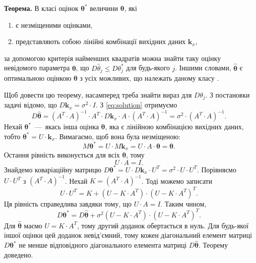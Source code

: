 \textbf{Теорема.}
В класі оцінок $\boldsymbol{\theta}^*$ величини $\boldsymbol{\theta}$, які
\begin{enumerate}
  \item є незміщеними оцінками,
  \item представляють собою лінійні комбінації вихідних даних $\boldsymbol{k}_x$,
\end{enumerate}
за допомогою критерія найменших
квадратів можна знайти таку оцінку невідомого параметра $\boldsymbol{\theta}$,
що $D\hat{\theta}_j \leq D \theta_j^*$ для будь-якого $j$.
Іншими словами,
$\hat{\boldsymbol{\theta}}$ є оптимальною оцінкою $\boldsymbol{\theta}$ з усіх можливих,
що належать даному класу \cite{hudson:least-squares}.

Щоб довести цю теорему, насамперед треба знайти вираз для $D \theta_j$.
З постановки задачі відомо, що $D\boldsymbol{k}_x = \sigma^2 \cdot I$.
З \eqref{eq:solution} отримуємо
\begin{equation*}
  D\hat{\boldsymbol{\theta}} =
  \left( A^T \cdot A \right)^{-1} \cdot A^T \cdot D\boldsymbol{k}_x \cdot A \cdot
  \left( A^T \cdot A \right)^{-1} =
  \sigma^2 \cdot \left( A^T \cdot A \right)^{-1}.
\end{equation*}
Нехай $\boldsymbol{\theta}^*$~---~якась інша оцінка $\boldsymbol{\theta}$,
яка є лінійною комбінацією вихідних даних,
тобто $\boldsymbol{\theta}^* = U \cdot \boldsymbol{k}_x$.
Вимагаємо, щоб вона була незміщеною:
\begin{equation*}
  M\boldsymbol{\theta}^* =
  U \cdot M\boldsymbol{k}_x =
  U \cdot A \cdot \boldsymbol{\theta} =
  \boldsymbol{\theta}.
\end{equation*}
Остання рівність виконується для всіх $\boldsymbol{\theta}$, тому
\begin{equation*}
  U \cdot A = I.
\end{equation*}
Знайдемо коваріаційну матрицю
$D\boldsymbol{\theta}^* =
  U \cdot D\boldsymbol{k}_x \cdot U^T =
  \sigma^2 \cdot U \cdot U^T$.
Порівняємо $U \cdot U^T$ з $ \left( A^T \cdot A \right)^{-1}$.
Нехай $K = \left( A^T \cdot A \right)^{-1}$.
Тоді можемо записати
\begin{equation*}
  U \cdot U^T =
  K + \left( U - K \cdot A^T \right) \cdot \left( U - K \cdot A^T \right)^T.
\end{equation*}
Ця рівність справедлива завдяки тому, що $U \cdot A = I$.
Таким чином,
\begin{equation*}
  D\boldsymbol{\theta}^* =
  D\hat{\boldsymbol{\theta}} +
  \sigma^2 \left( U - K \cdot A^T \right) \cdot
  \left( U - K \cdot A^T \right)^T.
\end{equation*}
Для $\hat{\boldsymbol{\theta}}$ маємо $U = K \cdot A^T$,
тому другий доданок обертається в нуль.
Для будь-якої іншої оцінки цей доданок невід'ємний, тому
кожен діагональний елемент матриці $D\boldsymbol{\theta}^*$
не менше відповідного діагонального елемента матриці $D\hat{\boldsymbol{\theta}}$.
Теорему доведено.

